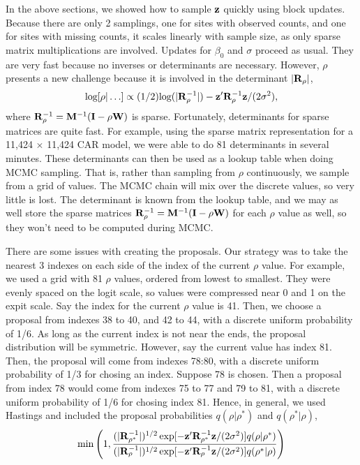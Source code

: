 \documentclass[11pt, titlepage]{article}
\begin{document}
\begin{flushleft}
\begin{onehalfspace}
In the above sections, we showed how to sample $\mathbf{z}$ quickly using block updates.  Because there are only 2 samplings, one for sites with observed counts, and one for sites with missing counts, it scales linearly with sample size, as only sparse matrix multiplications are involved.  Updates for $\beta_{0}$ and $\sigma$ proceed as usual.  They are very fast because no inverses or determinants are necessary.  However, $\rho$ presents a new challenge because it is involved in the determinant $|\mathbf{R}_{\rho}|$,
$$
\textrm{log}[\rho|\ldots] \propto (1/2)\textrm{log}(|\mathbf{R}_{\rho}^{-1}|) - \mathbf{z}^{\prime}\mathbf{R}_{\rho}^{-1}\mathbf{z}/(2\sigma^{2}),
$$
where $\mathbf{R}_{\rho}^{-1} = \mathbf{M}^{-1}(\mathbf{I} - \rho\mathbf{W})$ is sparse. Fortunately, determinants for sparse matrices are quite fast. For example, using the sparse matrix representation for a 11,424 $\times$ 11,424 CAR model, we were able to do 81 determinants in several minutes.  These determinants can then be used as a lookup table when doing MCMC sampling.  That is, rather than sampling from $\rho$ continuously, we sample from a grid of values.  The MCMC chain will mix over the discrete values, so very little is lost. The determinant is known from the lookup table, and we may as well store the sparse matrices $\mathbf{R}_{\rho}^{-1}=\mathbf{M}^{-1}(\mathbf{I} - \rho\mathbf{W})$ for each $\rho$ value as well, so they won't need to be computed during MCMC.

There are some issues with creating the proposals.  Our strategy was to take the nearest 3 indexes on each side of the index of the current $\rho$ value.  For example, we used a grid with 81 $\rho$ values, ordered from lowest to smallest.  They were evenly spaced on the logit scale, so values were compressed near 0 and 1 on the expit scale.  Say the index for the current $\rho$ value is 41. Then, we choose a proposal from indexes 38 to 40, and 42 to 44, with a discrete uniform probability of 1/6.  As long as the current index is not near the ends, the proposal distribution will be symmetric.  However, say the current value has index 81.  Then, the proposal will come from indexes 78:80, with a discrete uniform probability of 1/3 for chosing an index.  Suppose 78 is chosen.  Then a proposal from index 78 would come from indexes 75 to 77 and 79 to 81, with a discrete uniform probability of 1/6 for chosing index 81.  Hence, in general, we used Hastings and included the proposal probabilities $q(\rho|\rho^{*})$ and $q(\rho^{*}|\rho)$,
$$
\min\left(1,\frac{(|\mathbf{R}_{\rho^{*}}^{-1}|)^{1/2} \exp[- \mathbf{z}^{\prime}\mathbf{R}_{\rho^{*}}^{-1}\mathbf{z}/(2\sigma^{2})]q(\rho|\rho^{*})}
	{(|\mathbf{R}_{\rho}^{-1}|)^{1/2} \exp[- \mathbf{z}^{\prime}\mathbf{R}_{\rho}^{-1}\mathbf{z}/(2\sigma^{2})]q(\rho^{*}|\rho)}
\right)
$$


\end{onehalfspace}
\end{flushleft}
\end{document}
